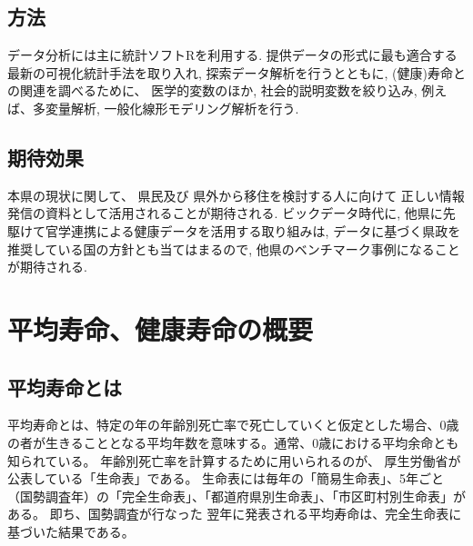 \section{方法}
データ分析には主に統計ソフトRを利用する. 提供データの形式に最も適合する最新の可視化統計手法を取り入れ, 探索データ解析を行うとともに, (健康)寿命との関連を調べるために、
医学的変数のほか, 社会的説明変数を絞り込み,
例えば、多変量解析, 一般化線形モデリング解析を行う.



\section{期待効果}
本県の現状に関して、
県民及び
県外から移住を検討する人に向けて
正しい情報発信の資料として活用されることが期待される.
ビックデータ時代に, 他県に先駆けて官学連携による健康データを活用する取り組みは, データに基づく県政を推奨している国の方針とも当てはまるので, 他県のベンチマーク事例になることが期待される.


\chapter{平均寿命、健康寿命の概要}

\section{平均寿命とは}


平均寿命とは、特定の年の年齢別死亡率で死亡していくと仮定とした場合、0歳の者が生きることとなる平均年数を意味する。通常、0歳における平均余命とも知られている。
年齢別死亡率を計算するために用いられるのが、
厚生労働省が公表している「生命表」である。
生命表には毎年の「簡易生命表」、5年ごと（国勢調査年）の「完全生命表」、「都道府県別生命表」、「市区町村別生命表」がある。
即ち、国勢調査が行なった
翌年に発表される平均寿命は、完全生命表に基づいた結果である。


%
%
%
%
%
%
%
%



